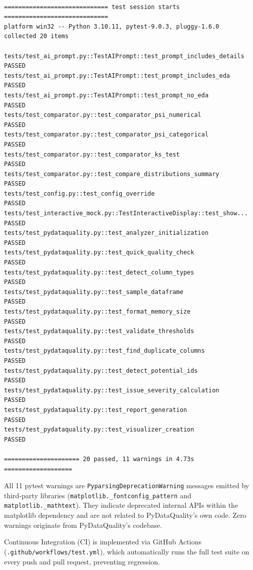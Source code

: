 \documentclass{article}
\begin{document}
\begin{verbatim}

============================= test session starts =============================
platform win32 -- Python 3.10.11, pytest-9.0.3, pluggy-1.6.0
collected 20 items

tests/test_ai_prompt.py::TestAIPrompt::test_prompt_includes_details  PASSED
tests/test_ai_prompt.py::TestAIPrompt::test_prompt_includes_eda      PASSED
tests/test_ai_prompt.py::TestAIPrompt::test_prompt_no_eda            PASSED
tests/test_comparator.py::test_comparator_psi_numerical              PASSED
tests/test_comparator.py::test_comparator_psi_categorical            PASSED
tests/test_comparator.py::test_comparator_ks_test                    PASSED
tests/test_comparator.py::test_compare_distributions_summary         PASSED
tests/test_config.py::test_config_override                           PASSED
tests/test_interactive_mock.py::TestInteractiveDisplay::test_show... PASSED
tests/test_pydataquality.py::test_analyzer_initialization            PASSED
tests/test_pydataquality.py::test_quick_quality_check               PASSED
tests/test_pydataquality.py::test_detect_column_types               PASSED
tests/test_pydataquality.py::test_sample_dataframe                  PASSED
tests/test_pydataquality.py::test_format_memory_size                PASSED
tests/test_pydataquality.py::test_validate_thresholds               PASSED
tests/test_pydataquality.py::test_find_duplicate_columns            PASSED
tests/test_pydataquality.py::test_detect_potential_ids              PASSED
tests/test_pydataquality.py::test_issue_severity_calculation        PASSED
tests/test_pydataquality.py::test_report_generation                 PASSED
tests/test_pydataquality.py::test_visualizer_creation               PASSED

===================== 20 passed, 11 warnings in 4.73s ===================
\end{verbatim}

All 11 pytest warnings are \texttt{PyparsingDeprecationWarning} messages
emitted by third-party libraries
(\texttt{matplotlib.\_fontconfig\_pattern} and
\texttt{matplotlib.\_mathtext}). They indicate deprecated internal APIs
within the matplotlib dependency and are not related to PyDataQuality's
own code. Zero warnings originate from PyDataQuality's codebase.

Continuous Integration (CI) is implemented via GitHub Actions
(\texttt{.github/workflows/test.yml}), which automatically runs the full
test suite on every push and pull request, preventing regression.
\end{document}
